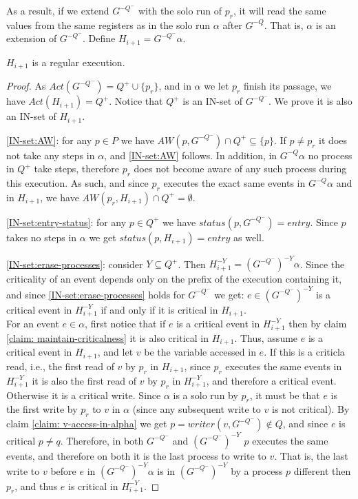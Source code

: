 As a result, if we extend $G^{-Q^-}$ with the solo run of $p_r$, it will read the same values from the same registers as in the solo run $\alpha$ after $G^{-Q}$. That is, $\alpha$ is an extension of $G^{-Q^-}$. Define $H_{i+1} = G^{-Q^-} \alpha$.

\begin{claim-subsection}
	$H_{i+1}$ is a regular execution.
\end{claim-subsection}

\begin{proof}
	
	As $Act(G^{-Q^-}) = Q^+ \cup \{p_r\}$, and in $\alpha$ we let $p_r$ finish its passage, we have $Act(H_{i+1}) = Q^+$. Notice that $Q^+$ is an IN-set of $G^{-Q^-}$. We prove it is also an IN-set of $H_{i+1}$.
	
	\ref{IN-set:AW}: for any $p \in P$ we have $AW(p,G^{-Q^-}) \cap Q^+ \subseteq \{p\}$. If $p \neq p_r$ it does not take any steps in $\alpha$, and \ref{IN-set:AW} follows. In addition, in $G^{-Q} \alpha$ no process in $Q^+$ take steps, therefore $p_r$ does not become aware of any such process during this execution. As such, and since $p_r$ executes the exact same events in $G^{-Q} \alpha$ and in $H_{i+1}$, we have $AW(p_r, H_{i+1}) \cap Q^+ = \emptyset$.
	
	\ref{IN-set:entry-status}: for any $p \in Q^+$ we have $status(p,G^{-Q^-}) = entry$. Since $p$ takes no steps in $\alpha$ we get $status(p,H_{i+1}) = entry$ as well.
	
	\ref{IN-set:erase-processes}: consider $Y \subseteq Q^+$. Then $H_{i+1}^{-Y} = (G^{-Q^-})^{-Y} \alpha$. Since the criticality of an event depends only on the prefix of the execution containing it, and since \ref{IN-set:erase-processes} holds for $G^{-Q^-}$ we get: $e \in (G^{-Q^-})^{-Y}$ is a critical event in $H_{i+1}^{-Y}$ if and only if it is critical in $H_{i+1}$.
	\\ For an event $e \in \alpha$, first notice that if $e$ is a critical event in $H_{i+1}^{-Y}$ then by claim \ref{claim: maintain-criticalness} it is also critical in $H_{i+1}$. Thus, assume $e$ is a critical event in $H_{i+1}$, and let $v$ be the variable accessed in $e$. If this is a criticla read, i.e., the first read of $v$ by $p_r$ in $H_{i+1}$, since $p_r$ executes the same events in $H_{i+1}^{-Y}$ it is also the first read of $v$ by $p_r$ in $H_{i+1}^{-Y}$, and therefore a critical event. Otherwise it is a critical write. Since $\alpha$ is a solo run by $p_r$, it must be that $e$ is the first write by $p_r$ to $v$ in $\alpha$ (since any subsequent write to $v$ is not critical). By claim \ref{claim: v-access-in-alpha} we get $p = writer(v,G^{-Q^-}) \notin Q$, and since $e$ is critical $p \neq q$. Therefore, in both $G^{-Q^-}$ and $(G^{-Q^-})^{-Y}$ $p$ executes the same events, and therefore on both it is the last process to write to $v$. That is, the last write to $v$ before $e$ in $(G^{-Q^-})^{-Y} \alpha$ is in $(G^{-Q^-})^{-Y}$ by a process $p$ different then $p_r$, and thus $e$ is critical in $H_{i+1}^{-Y}$.
	

\end{proof}
